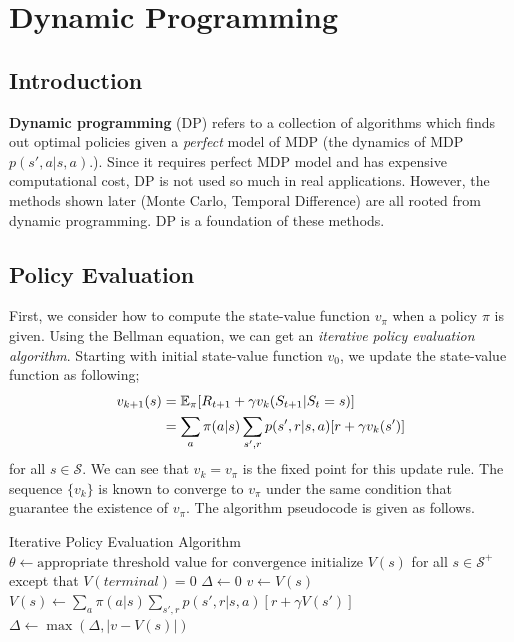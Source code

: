 \documentclass[../../main.tex]{subfiles}
\begin{document}
\chapter{Dynamic Programming}

\section{Introduction}
    \textbf{Dynamic programming} (DP) refers to a collection of algorithms which finds out optimal policies
    given a \emph{perfect} model of MDP (the dynamics of MDP $p(s',a|s,a)$.). Since it requires perfect MDP model and has expensive computational cost,
    DP is not used so much in real applications. However, the methods shown later
    (Monte Carlo, Temporal Difference) are all rooted from dynamic programming. DP is a foundation of these methods.

\section{Policy Evaluation}
    First, we consider how to compute the state-value function $v_\pi$ when a policy $\pi$ is given.
    Using the Bellman equation, we can get an \emph{iterative policy evaluation algorithm}.
    Starting with initial state-value function $v_0$, we update the state-value function as following;
    \begin{align}
        v_{k+1}(s) &= \mathbb{E}_\pi[R_{t+1}+\gamma v_k(S_{t+1}|S_t=s)] \\
        &= \sum_{a}\pi(a|s)\sum_{s',r}p(s',r|s,a)[r + \gamma v_k(s')] \label{iterPolicyEvalUpdate}
    \end{align}
    for all $s \in \mathcal{S}$.
    We can see that $v_k=v_\pi$ is the fixed point for this update rule. The sequence $\{v_k\}$ is known to converge to
    $v_\pi$ under the same condition that guarantee the existence of $v_\pi$. The algorithm pseudocode is given as follows.

    {Iterative Policy Evaluation Algorithm}
    { \\
    }
    {}
    {
        $\theta \leftarrow \text{appropriate threshold value for convergence}$\;
        initialize $V(s)$ for all $s \in \mathcal{S}^+$ except that $V(terminal)=0$\;
        \Repeat{$\Delta < \theta$}
        {
            $\Delta \leftarrow 0$\;
            {
                $v \leftarrow V(s)$\;
                $V(s) \leftarrow \sum_{a}\pi(a|s)\sum_{s',r}p(s',r|s,a)[r + \gamma V(s')]$\;
                $\Delta \leftarrow \max(\Delta, |v-V(s)|)$\;
            }
        }
    }
\end{document}
